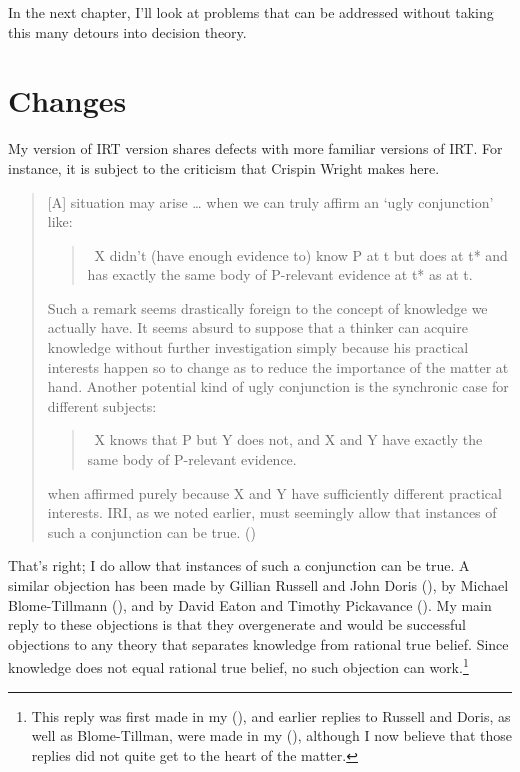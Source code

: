 \documentclass[
  10pt,
  letterpaper,
  twoside]{scrbook}
\begin{document}
In the next chapter, I'll look at problems that can be addressed without
taking this many detours into decision theory.


\chapter{Changes}\label{sec-changes}

My version of IRT version shares defects with more familiar versions of
IRT. For instance, it is subject to the criticism that Crispin Wright
makes here.

\begin{quote}
{[}A{]} situation may arise \ldots{} when we can truly affirm an `ugly
conjunction' like:

\begin{quote}
~X didn't (have enough evidence to) know P at t but does at t* and has
exactly the same body of P-relevant evidence at t* as at t.
\end{quote}

Such a remark seems drastically foreign to the concept of knowledge we
actually have. It seems absurd to suppose that a thinker can acquire
knowledge without further investigation simply because his practical
interests happen so to change as to reduce the importance of the matter
at hand. Another potential kind of ugly conjunction is the synchronic
case for different subjects:

\begin{quote}
~X knows that P but Y does not, and X and Y have exactly the same body
of P-relevant evidence.
\end{quote}

when affirmed purely because X and Y have sufficiently different
practical interests. IRI, as we noted earlier, must seemingly allow that
instances of such a conjunction can be true.
()
\end{quote}

That's right; I do allow that instances of such a conjunction can be
true. A similar objection has been made by Gillian Russell and John
Doris (), by Michael Blome-Tillmann
(), and by David Eaton and Timothy
Pickavance (). My main reply to
these objections is that they overgenerate and would be successful
objections to any theory that separates knowledge from rational true
belief. Since knowledge does not equal rational true belief, no such
objection can work.\footnote{This reply was first made in my
  (), and earlier replies to
  Russell and Doris, as well as Blome-Tillman, were made in my
  (), although I now believe
  that those replies did not quite get to the heart of the matter.}
\end{document}
